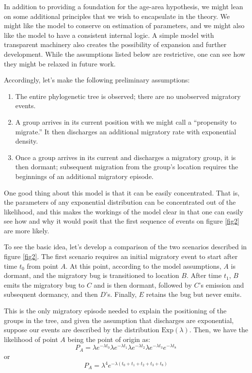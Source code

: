 \documentclass[11pt]{article}
\begin{document}
In addition to providing a foundation for the age-area hypothesis, we might lean on some additional principles that we wish to encapsulate in the theory. We might like the model to conserve on estimation of parameters, and we might also like the model to have a consistent internal logic. A simple model with transparent machinery also creates the possibility of expansion and further development. While the assumptions listed below are restrictive, one can see how they might be relaxed in future work.

Accordingly, let's make the following preliminary assumptions:
\begin{enumerate}
\item The entire phylogenetic tree is observed; there are no unobserved migratory events.
\item A group arrives in its current position with we might call a ``propensity to migrate.'' It then discharges an additional migratory rate with exponential density.
\item Once a group arrives in its current and discharges a migratory group, it is then dormant; subsequent migration from the group's location requires the beginnings of an additional migratory episode.
\end{enumerate}

One good thing about this model is that it can be easily concentrated. That is, the parameters of any exponential distribution can be concentrated out of the likelihood, and this makes the workings of the model clear in that one can easily see how and why it would posit that the first sequence of events on figure \ref{fig2} are more likely.

To see the basic idea, let's develop a comparison of the two scenarios described in figure \ref{fig2}. The first scenario requires an initial migratory event to start after time $t_0$ from point $A$. At this point, according to the model assumptions, $A$ is dormant, and the migratory bug is transitioned to location $B$. After time $t_1$, $B$ emits the migratory bug to $C$ and is then dormant, followed by $C$'s emission and subsequent dormancy, and then $D$'s. Finally, $E$ retains the bug but never emits.

This is the only migratory episode needed to explain the positioning of the groups in the tree, and given the assumption that discharges are exponential, suppose our events are described by the distribution $\textrm{Exp}(\lambda)$. Then, we have the likelihood of point $A$ being the point of origin as:
\begin{equation} \label{e1}
P_A = \lambda e^{-\lambda t_0}\lambda e^{-\lambda t_1}\lambda e^{-\lambda t_2}\lambda e^{-\lambda t_3}e^{-\lambda t_8}
\end{equation}
or
\begin{equation} \label{e2}
P_A = \lambda^4 e^{-\lambda (t_0+t_1+t_2+t_3+t_8)}
\end{equation}
\end{document}
